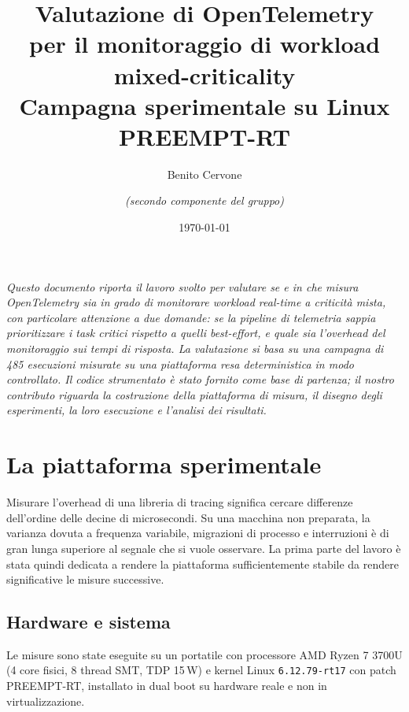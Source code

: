 \documentclass[11pt,a4paper]{article}
\title{\vspace{-1.4cm}\textbf{Valutazione di OpenTelemetry\\per il monitoraggio di workload mixed-criticality}\\[.3em]
\large Campagna sperimentale su Linux PREEMPT-RT}
\author{Benito Cervone \and \textit{(secondo componente del gruppo)}}
\date{\today}
\begin{document}
\maketitle
\thispagestyle{empty}

\begin{center}
\begin{minipage}{0.9\textwidth}
\small\itshape
Questo documento riporta il lavoro svolto per valutare se e in che misura OpenTelemetry sia in
grado di monitorare workload real-time a criticit\`a mista, con particolare attenzione a due
domande: se la pipeline di telemetria sappia \emph{prioritizzare} i task critici rispetto a quelli
best-effort, e quale sia l'\emph{overhead} del monitoraggio sui tempi di risposta. La valutazione
si basa su una campagna di 485 esecuzioni misurate su una piattaforma resa deterministica in modo
controllato. Il codice strumentato \`e stato fornito come base di partenza; il nostro contributo
riguarda la costruzione della piattaforma di misura, il disegno degli esperimenti, la loro
esecuzione e l'analisi dei risultati.
\end{minipage}
\end{center}

\vspace{1em}
{\small\tableofcontents}
\newpage

\section{La piattaforma sperimentale}

Misurare l'overhead di una libreria di tracing significa cercare differenze dell'ordine delle
decine di microsecondi. Su una macchina non preparata, la varianza dovuta a frequenza variabile,
migrazioni di processo e interruzioni \`e di gran lunga superiore al segnale che si vuole
osservare. La prima parte del lavoro \`e stata quindi dedicata a rendere la piattaforma
sufficientemente stabile da rendere significative le misure successive.

\subsection{Hardware e sistema}

Le misure sono state eseguite su un portatile con processore AMD Ryzen 7 3700U (4 core fisici,
8 thread SMT, TDP 15\,W) e kernel Linux \texttt{6.12.79-rt17} con patch PREEMPT-RT, installato
in dual boot su hardware reale e non in virtualizzazione.
\end{document}

